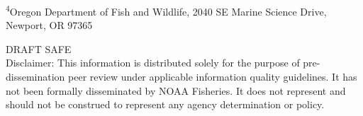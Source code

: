 \begin{center}
\textsuperscript{4}Oregon Department of Fish and Wildlife, 2040 SE Marine Science Drive, Newport, OR 97365\\


\vspace{.5cm}

\vfill
DRAFT SAFE\\
Disclaimer: This information is distributed solely for the purpose of pre-dissemination
peer review under applicable information quality guidelines. It has not been formally
disseminated by NOAA Fisheries. It does not represent and should not be construed to
represent any agency determination or policy. 

\vspace{.3cm}

\maketitle

\setcounter{page}{1}
\end{center}


